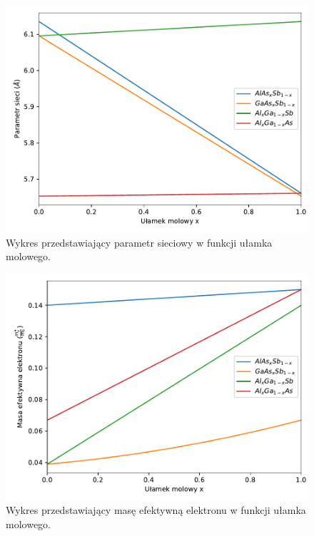 \documentclass[12pt,openany,a4paper]{book}
\begin{document}
\begin{figure}[H]
	\centering
	\includegraphics[width = 0.9\linewidth]{Figures/ternary/alc.pdf}
	\caption{Wykres przedstawiający parametr sieciowy w funkcji ułamka 
	molowego.}\label{fig:ter_alc}
\end{figure}

\begin{figure}[H]
	\centering
	\includegraphics[width = 0.9\linewidth]{Figures/ternary/m_e.pdf}
	\caption{Wykres przedstawiający masę efektywną elektronu w funkcji ułamka 
	molowego.}\label{fig:ter_me}
\end{figure}
\end{document}
